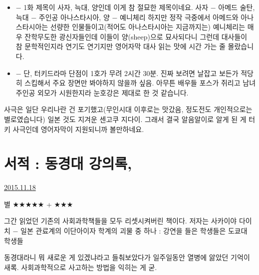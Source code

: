 \begin{itemize}
    \item $-$ 1화 제목이 사자, 늑대, 양인데 이게 참 절묘한 제목이네요.
    사자 $-$ 아메드 술탄, 늑대 $-$ 주인공 아나스타시아, 양 $-$ 예니체리
    하지만 정작 극중에서 아메드와 아나스타시아는 선량한 인물들이고(적어도 아나스타시아는 지금까지는)
    예니체리는 매우 잔학무도한 광신자들인데 이들이 양(sheep)으로 묘사되다니
    그런데 대사들이 참 문학적인지라 연기도 연기지만 영어자막 대사 읽는 맛에 시간 가는 줄 몰랐습니다.
    \vspace{5mm}

    \item $-$ 단, 터키드라마 단점이 1호가 무려 2시간 30분.
    진짜 보려면 날잡고 보든가 적당히 스킵해서 주요 장면만 봐야하지 않을까 싶음.
    아무튼 배우들 포스가 쥐리고 남녀 주인공 외모가 시원한지라 눈호강은 제대로 한 것 같습니다.
    \vspace{5mm}

\end{itemize}
사극은 일단 우리나란 건 포기했고(무인시대 이후로는 맛갔음, 정도전도 개인적으로는 별로였습니다)
일본 것도 지겨운 센고쿠 지다이.
그래서 결국 알음알이로 알게 된 게 터키 사극인데 영어자막이 지원되니까 볼만하네요.
\vspace{5mm}















\section{서적 : 동경대 강의록,}
\href{https://www.kockoc.com/Apoc/497599}{2015.11.18}

\vspace{5mm}

별 $\bigstar$$\bigstar$$\bigstar$$\bigstar$$\bigstar$ + $\bigstar$$\bigstar$$\bigstar$
\vspace{5mm}

그간 읽었던 기존의 사회과학책들을 모두 리셋시켜버린 책이다.
저자는 사카이야 다이치 $-$ 일본 관료계의 이단아이자 학계의 괴물 중 하나 :
강연을 들은 학생들은 도쿄대 학생들
\vspace{5mm}

동경대라니 뭐 새로운 게 있겠냐라고 들춰보았다가 일주일동안 열병에 앓았던 기억이 새록.
사회과학적으로 사고하는 방법을 익히는 게 굳.
\vspace{5mm}

